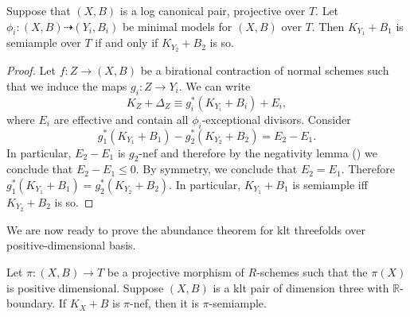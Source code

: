 \documentclass[a4paper,12pt]{book}
\begin{document}
	\begin{lemma}\label{inv}
		Suppose that $(X,B)$ is a log canonical pair, projective over $T$. 
		Let $\phi_{i} \colon (X, B) \dashrightarrow (Y_{i},B_{i})$ be minimal models for $(X,B)$ over $T$. 
		Then $K_{Y_{1}}+B_{1}$ is semiample over $T$ if and only if $K_{Y_{2}}+B_{2}$ is so.
	\end{lemma}
	\begin{proof}
		
		Let $f \colon Z \to (X,B)$ be a birational contraction of normal schemes such that we induce the maps $g_i \colon Z \to Y_i$. We can write
		$$K_Z+\Delta_Z \equiv g_i^*(K_{Y_i}+B_i) + E_i,$$
		where $E_i$ are effective and contain all $\phi_i$-exceptional divisors.
		Consider 
		$$g_1^*(K_{Y_1}+B_1)-g_2^*(K_{Y_2}+B_2)=E_2-E_1. $$
		In particular, $E_2-E_1$ is $g_2$-nef and therefore by the negativity lemma (\cite[Lemma 2.14]{bhatt2020}) we conclude that $E_2 -E_1 \leq 0$. By symmetry, we conclude that $E_2=E_1$. Therefore $g_1^*(K_{Y_1}+B_1)=g_2^*(K_{Y_2}+B_2)$. In particular, $K_{Y_1}+B_1$ is semiample  iff $K_{Y_2}+B_2$ is so.
	\end{proof}
	
	We are now ready to prove the abundance theorem for klt threefolds over positive-dimensional basis.
	
	\begin{theorem}\label{abundance}
		Let $\pi \colon (X,B) \to T$ be a projective morphism of $R$-schemes such that the $\pi(X)$ is positive dimensional.
		Suppose $(X,B)$ is a klt pair of dimension three with $\mathbb{R}$-boundary. If $K_X+B$ is $\pi$-nef, then it is $\pi$-semiample.
	\end{theorem}
	
\end{document}
